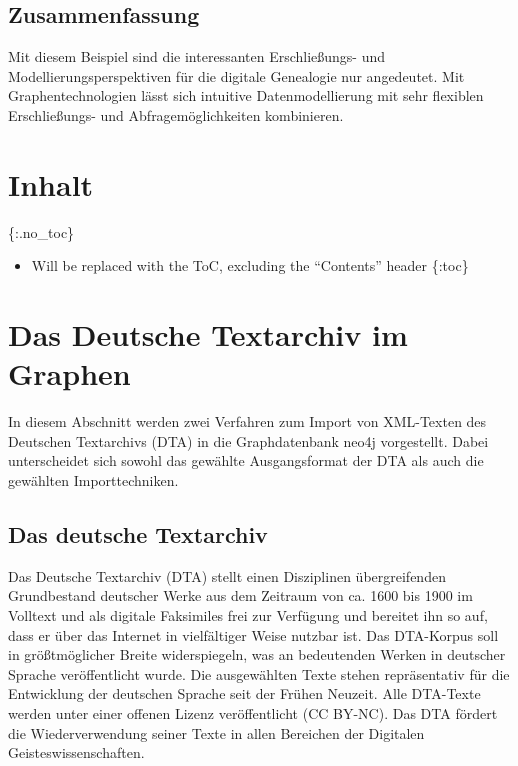 \documentclass[ngerman,]{scrreprt}
\providecommand{\tightlist}{%
  \setlength{\itemsep}{0pt}\setlength{\parskip}{0pt}}
\begin{document}
\section{Zusammenfassung}\label{zusammenfassung-4}

Mit diesem Beispiel sind die interessanten Erschließungs- und Modellierungsperspektiven für die digitale Genealogie nur angedeutet. Mit Graphentechnologien lässt sich intuitive Datenmodellierung mit sehr flexiblen Erschließungs- und Abfragemöglichkeiten kombinieren.

\chapter{Inhalt}\label{inhalt-6}

\{:.no\_toc\}

\begin{itemize}
\tightlist
\item
  Will be replaced with the ToC, excluding the ``Contents'' header \{:toc\}
\end{itemize}

\chapter{Das Deutsche Textarchiv im Graphen}\label{das-deutsche-textarchiv-im-graphen}

In diesem Abschnitt werden zwei Verfahren zum Import von XML-Texten des Deutschen Textarchivs (DTA) in die Graphdatenbank neo4j vorgestellt. Dabei unterscheidet sich sowohl das gewählte Ausgangsformat der DTA als auch die gewählten Importtechniken.

\section{Das deutsche Textarchiv}\label{das-deutsche-textarchiv}

Das Deutsche Textarchiv (DTA) stellt einen Disziplinen übergreifenden Grundbestand deutscher Werke aus dem Zeitraum von ca. 1600 bis 1900 im Volltext und als digitale Faksimiles frei zur Verfügung und bereitet ihn so auf, dass er über das Internet in vielfältiger Weise nutzbar ist. Das DTA-Korpus soll in größtmöglicher Breite widerspiegeln, was an bedeutenden Werken in deutscher Sprache veröffentlicht wurde. Die ausgewählten Texte stehen repräsentativ für die Entwicklung der deutschen Sprache seit der Frühen Neuzeit. Alle DTA-Texte werden unter einer offenen Lizenz veröffentlicht (CC BY-NC). Das DTA fördert die Wiederverwendung seiner Texte in allen Bereichen der Digitalen Geisteswissenschaften.
\end{document}
